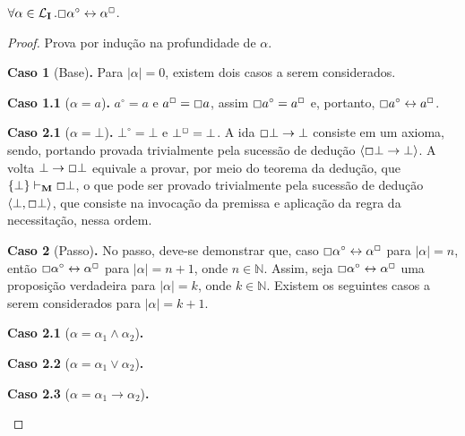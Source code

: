 \begin{theorem}
    $\forall\alpha\in\mathcal{L}_\mathbf{I}\,.\Box\alpha^\circ\leftrightarrow\alpha^\Box$.
\end{theorem}

\begin{proof}
    Prova por indução na profundidade de $\alpha$.

    \begin{case}
        \textbf{Caso 1} (Base)\textbf{.}
            Para $|\alpha| = 0$, existem dois casos a serem considerados.

            \begin{case}
            \textbf{Caso 1.1} ($\alpha = a$)\textbf{.}
                $a^\circ = a$ e $a^\Box = \Box a$, assim $\Box a^\circ = a^\Box$ e, portanto, $\Box a^\circ \leftrightarrow a^\Box$.
            \end{case}
            \begin{case}
            \textbf{Caso 2.1} ($\alpha = \bot$)\textbf{.}
                $\bot^\circ = \bot$ e $\bot^\Box = \bot$. A ida $\Box\bot\to\bot$ consiste em um axioma, sendo, portando provada trivialmente pela sucessão de dedução $\langle\Box\bot\to\bot\rangle$.
                A volta $\bot\to\Box\bot$ equivale a provar, por meio do teorema da dedução, que $\{\bot\}\vdash_\mathbf{M}\Box\bot$, o que pode ser provado trivialmente pela sucessão de dedução $\langle\bot, \Box\bot\rangle$, que consiste na invocação da premissa e aplicação da regra da necessitação, nessa ordem.
            \end{case}
    \end{case}

    \begin{case}
        \textbf{Caso 2} (Passo)\textbf{.} No passo, deve-se demonstrar que, caso $\Box\alpha^\circ\leftrightarrow\alpha^\Box$ para $|\alpha| = n$, 
        então $\Box\alpha^\circ\leftrightarrow\alpha^\Box$ para $|\alpha| = n + 1$, onde $n \in \mathbb{N}$. Assim, seja $\Box\alpha^\circ\leftrightarrow\alpha^\Box$ uma proposição verdadeira para $|\alpha| = k$, onde $k \in \mathbb{N}$. Existem os seguintes casos a serem considerados para $|\alpha| = k + 1$.

        \begin{case}
            \textbf{Caso 2.1} ($\alpha = \alpha_1\wedge\alpha_2$)\textbf{.}
        \end{case}

        \begin{case}
            \textbf{Caso 2.2} ($\alpha = \alpha_1\vee\alpha_2$)\textbf{.}
        \end{case}

        \begin{case}
            \textbf{Caso 2.3} ($\alpha = \alpha_1\to\alpha_2$)\textbf{.}
        \end{case}
    \end{case}
\end{proof}

